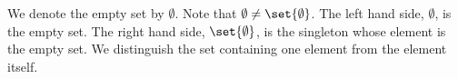 We denote the empty set
by $\emptyset$.
Note that
$\emptyset \neq \set{\emptyset}$.
The left hand side, $\emptyset$,
is the empty set.
The right hand side, $\set{\emptyset}$, is
the singleton whose element
is the empty set.
We distinguish the set
containing one element from the
element itself.


\strats
